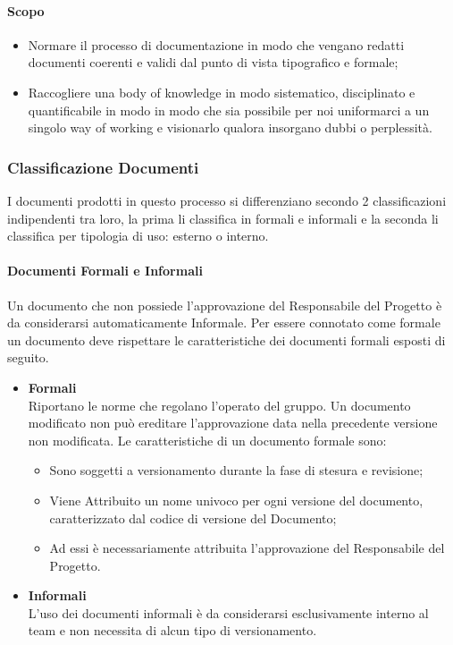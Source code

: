             \paragraph{Scopo}
                \begin{itemize}
                    \item Normare il processo di documentazione in modo che vengano redatti documenti coerenti e validi dal punto di vista tipografico e formale;
                    \item Raccogliere una body of knowledge in modo sistematico, disciplinato e quantificabile in modo in modo che sia possibile per noi uniformarci a un singolo way of working e visionarlo qualora insorgano dubbi o perplessità.
                \end{itemize}
        \subsubsection{Classificazione Documenti}
            I documenti prodotti in questo processo si differenziano secondo 2 classificazioni indipendenti tra loro, la prima li classifica in formali e informali e la seconda li classifica per tipologia di uso: esterno o interno.
            \paragraph{Documenti Formali e Informali}
                Un documento che non possiede l’approvazione del Responsabile del Progetto è da considerarsi automaticamente Informale. Per essere connotato come formale un documento deve rispettare le caratteristiche dei documenti formali esposti di seguito.
                \begin{itemize}
                    \item\textbf{Formali}\\
                        Riportano le norme che regolano l’operato del gruppo. Un documento modificato non può ereditare l’approvazione data nella precedente versione non modificata.
                        Le caratteristiche di un documento formale sono:
                        \begin{itemize}
                            \item  Sono soggetti a versionamento durante la fase di stesura e revisione;
                            \item Viene Attribuito un nome univoco per ogni versione del documento, caratterizzato dal codice di versione del Documento;
                            \item  Ad essi è necessariamente attribuita l’approvazione del Responsabile del Progetto.
                        \end{itemize}

                    \item\textbf{Informali}\\
                        L’uso dei documenti informali è da considerarsi esclusivamente interno al team e non necessita di alcun tipo di versionamento.
                \end{itemize}
